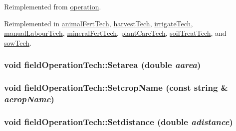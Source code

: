 Reimplemented from \hyperlink{classoperation_a239af45379b638fcb53c10873ef8bb16}{operation}.

Reimplemented in \hyperlink{classanimal_fert_tech_ace0ed6c38236d05cd521f98624431767}{animalFertTech}, \hyperlink{classharvest_tech_a8b2a5efa11d4ee3355c75cec9a080b27}{harvestTech}, \hyperlink{classirrigate_tech_a8c7f11f2ce9cb7e19851c81c69c91d0a}{irrigateTech}, \hyperlink{classmanual_labour_tech_a1b03a5bb1d552a3bacaeb5bb758a1e17}{manualLabourTech}, \hyperlink{classmineral_fert_tech_a25acfef0b5b6f2a6463fe9249d13cb9a}{mineralFertTech}, \hyperlink{classplant_care_tech_ac699023786b1759775d57e80b5817096}{plantCareTech}, \hyperlink{classsoil_treat_tech_a43342c7563137af6f07fd4b031f3c599}{soilTreatTech}, and \hyperlink{classsow_tech_aa606f377adfc0cf3fd80d96ba2576fcc}{sowTech}.\hypertarget{classfield_operation_tech_a9efae05c7ed6af7c42c37a84f0c81e11}{
\subsubsection[{Setarea}]{\setlength{\rightskip}{0pt plus 5cm}void fieldOperationTech::Setarea (double {\em aarea})}}
\label{classfield_operation_tech_a9efae05c7ed6af7c42c37a84f0c81e11}
\hypertarget{classfield_operation_tech_a23e8464a61b31d7d6047627b0eda44df}{
\subsubsection[{SetcropName}]{\setlength{\rightskip}{0pt plus 5cm}void fieldOperationTech::SetcropName (const string \& {\em acropName})}}
\label{classfield_operation_tech_a23e8464a61b31d7d6047627b0eda44df}
\hypertarget{classfield_operation_tech_a4830e2b43c699fb767cc85242a59e875}{
\subsubsection[{Setdistance}]{\setlength{\rightskip}{0pt plus 5cm}void fieldOperationTech::Setdistance (double {\em adistance})}}
